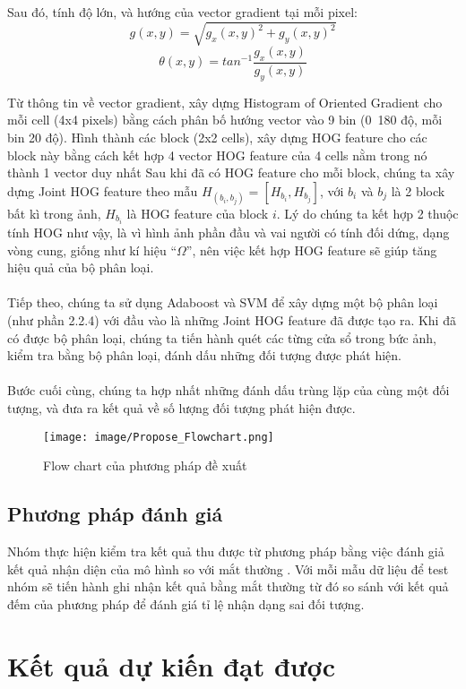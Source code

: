 \documentclass[12pt,a4paper]{article}
\begin{document}
Sau đó, tính độ lớn, và hướng của vector gradient tại mỗi pixel:
\begin{equation}
    g(x,y) = \sqrt{g_x(x,y)^2+g_y(x,y)^2}
\end{equation}
\begin{equation}
    \theta(x,y) = tan^{-1}\frac{g_x(x,y)}{g_y(x,y)}
\end{equation}

Từ thông tin về vector gradient, xây dựng Histogram of Oriented Gradient cho mỗi cell (4x4 pixels) bằng cách phân bố hướng vector vào 9 bin (0~180 độ, mỗi bin 20 độ). Hình thành các block (2x2 cells), xây dựng HOG feature cho các block này bằng cách kết hợp 4 vector HOG feature của 4 cells nằm trong nó thành 1 vector duy nhất
Sau khi đã có HOG feature cho mỗi block, chúng ta xây dựng Joint HOG feature theo mẫu $H_{(b_{i},b_{j})} = [H_{b_i}, H_{b_j}]$,  với $b_i$ và $b_j$ là 2 block bất kì trong ảnh, $H_{b_i}$ là HOG feature của block $i$. Lý do chúng ta kết hợp 2 thuộc tính HOG như vậy, là vì hình ảnh phần đầu và vai người có tính đối dứng, dạng vòng cung, giống như kí hiệu “$\Omega$”, nên việc kết hợp HOG feature sẽ giúp tăng hiệu quả của bộ phân loại.\\ \\
Tiếp theo, chúng ta sử dụng Adaboost và SVM để xây dựng một bộ phân loại (như phần 2.2.4) với đầu vào là những Joint HOG feature đã được tạo ra. Khi đã có được bộ phân loại, chúng ta tiến hành quét các từng cửa sổ trong bức ảnh, kiểm tra bằng bộ phân loại, đánh dấu những đối tượng được phát hiện.\\ \\
Bước cuối cùng, chúng ta hợp nhất những đánh dấu trùng lặp của cùng một đối tượng, và đưa ra kết quả về số lượng đối tượng phát hiện được.
\begin{figure}[ht!]
    \centering
    \texttt{[image: image/Propose\_Flowchart.png]}
    \caption{Flow chart của phương pháp đề xuất}
    \label{fig:my_label}
\end{figure}
		\subsection{Phương pháp đánh giá}
Nhóm thực hiện kiểm tra kết quả thu được từ phương pháp bằng việc đánh giả kết quả nhận diện của mô hình so với mắt thường . Với mỗi mẫu dữ liệu để test nhóm sẽ tiến hành ghi nhận kết quả bằng mắt thường từ đó so sánh với kết quả đếm của phương pháp để đánh giá tỉ lệ nhận dạng sai đối tượng.
\newpage
\section{Kết quả dự kiến đạt được}
\end{document}
